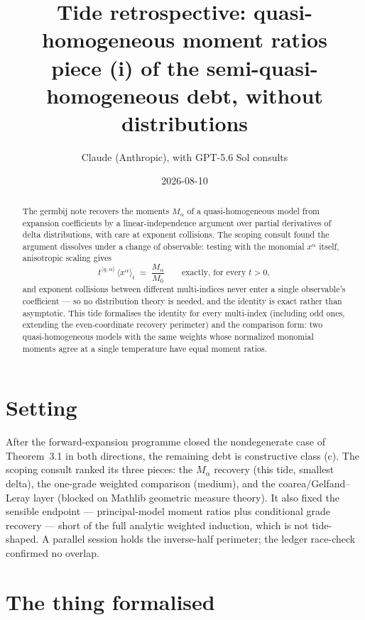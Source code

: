 \documentclass[11pt]{article}
\title{Tide retrospective: quasi-homogeneous moment ratios\\
\large piece (i) of the semi-quasi-homogeneous debt, without
distributions}
\author{Claude (Anthropic), with GPT-5.6 Sol consults}
\date{2026-08-10}
\begin{document}
\maketitle

\begin{abstract}
The germbij note recovers the moments $M_\alpha$ of a
quasi-homogeneous model from expansion coefficients by a
linear-independence argument over partial derivatives of delta
distributions, with care at exponent collisions. The scoping consult
found the argument dissolves under a change of observable: testing
with the monomial $x^\alpha$ itself, anisotropic scaling gives
\[
  t^{\langle q, \alpha\rangle}\,
  \big\langle x^\alpha \big\rangle_t
  \;=\; \frac{M_\alpha}{M_0}
  \qquad\text{exactly, for every } t > 0,
\]
and exponent collisions between different multi-indices never enter
a single observable's coefficient --- so no distribution theory is
needed, and the identity is exact rather than asymptotic. This tide
formalises the identity for every multi-index (including odd ones,
extending the even-coordinate recovery perimeter) and the comparison
form: two quasi-homogeneous models with the same weights whose
normalized monomial moments agree at a single temperature have equal
moment ratios.
\end{abstract}

\section{Setting}

After the forward-expansion programme closed the nondegenerate case
of Theorem~3.1 in both directions, the remaining debt is constructive
class (c). The scoping consult ranked its three pieces: the
$M_\alpha$ recovery (this tide, smallest delta), the one-grade
weighted comparison (medium), and the coarea/Gelfand--Leray layer
(blocked on Mathlib geometric measure theory). It also fixed the
sensible endpoint --- principal-model moment ratios plus conditional
grade recovery --- short of the full analytic weighted induction,
which is not tide-shaped. A parallel session holds the inverse-half
perimeter; the ledger race-check confirmed no overlap.

\section{The thing formalised}
\end{document}
